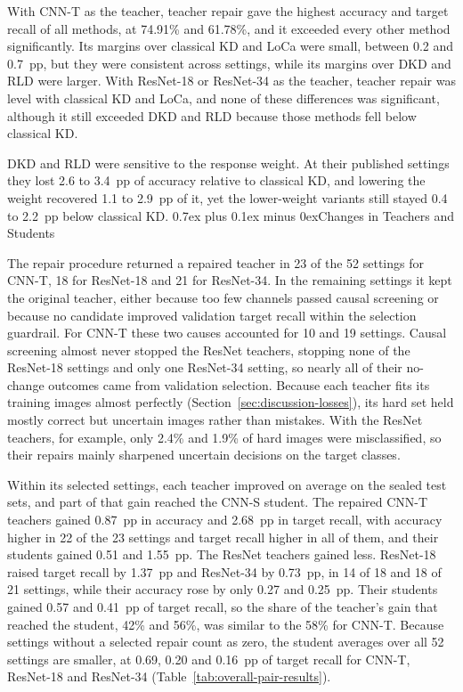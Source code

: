 \documentclass[10pt,journal,compsoc]{IEEEtran}
\makeatletter
\def\subsection{\@startsection{subsection}{2}{\z@}{-3.5ex plus -0.5ex minus -1.5ex}%
{0.7ex plus 0.1ex minus 0ex}{\normalfont\normalsize\sffamily\bfseries}}
\theoremstyle{definition}
\makeatother
\begin{document}
With CNN-T as the teacher, teacher repair gave the highest accuracy and
target recall of all methods, at 74.91\% and 61.78\%, and it exceeded
every other method significantly. Its margins over classical KD and
LoCa were small, between 0.2 and 0.7~pp, but they were consistent across
settings, while its margins over DKD and RLD were larger. With
ResNet-18 or ResNet-34 as the teacher, teacher repair was level with
classical KD and LoCa, and none of these differences was significant,
although it still exceeded DKD and RLD because those methods fell below
classical KD.

DKD and RLD were sensitive to the response weight. At their published
settings they lost 2.6 to 3.4~pp of accuracy relative to classical KD,
and lowering the weight recovered 1.1 to 2.9~pp of it, yet the
lower-weight variants still stayed 0.4 to 2.2~pp below classical KD.
\FloatBarrier
\vspace{-5pt}
\subsection{Changes in Teachers and Students}
\label{sec:teacher-student-changes}
\suppressfloats[t]

The repair procedure returned a repaired teacher in 23 of the 52
settings for CNN-T, 18 for ResNet-18 and 21 for ResNet-34. In the
remaining settings it kept the original teacher, either because too
few channels passed causal screening or because no candidate improved
validation target recall within the selection guardrail. For CNN-T these
two causes accounted for 10 and 19 settings. Causal screening almost
never stopped the ResNet teachers, stopping none of the ResNet-18
settings and only one ResNet-34 setting, so nearly all of their
no-change outcomes came from validation selection. Because each teacher
fits its training images almost perfectly
(Section~\ref{sec:discussion-losses}), its hard set held mostly correct
but uncertain images rather than mistakes. With the ResNet teachers, for
example, only 2.4\% and 1.9\% of hard images were misclassified, so their
repairs mainly sharpened uncertain decisions on the target classes.


Within its selected settings, each teacher improved on average on the
sealed test sets, and part of that gain reached the CNN-S student. The
repaired CNN-T teachers gained 0.87~pp in accuracy and 2.68~pp in
target recall, with accuracy higher in 22 of the 23 settings and target
recall higher in all of them, and their students gained 0.51 and
1.55~pp. The ResNet teachers gained less. ResNet-18 raised target
recall by 1.37~pp and ResNet-34 by 0.73~pp, in 14 of 18 and 18 of 21
settings, while their accuracy rose by only 0.27 and 0.25~pp. Their
students gained 0.57 and 0.41~pp of target recall, so the share of the
teacher's gain that reached the student, 42\% and 56\%, was similar to
the 58\% for CNN-T. Because settings without a selected repair count
as zero, the student averages over all 52 settings are smaller, at
0.69, 0.20 and 0.16~pp of target recall for CNN-T, ResNet-18 and
ResNet-34 (Table~\ref{tab:overall-pair-results}).
\end{document}
